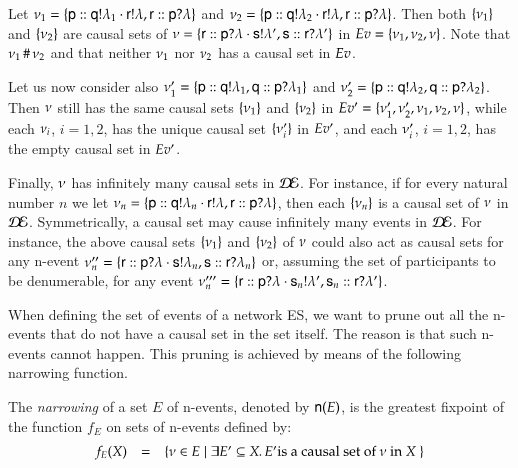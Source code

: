 \begin{example}
  Let $\nu_1=\{{\sf p}:: {\sf q}!\lambda_1\cdot
      {\sf r}!\lambda,{\sf r}:: {\sf p}?\lambda\}$ and
  $\nu_2=\{{\sf p}:: {\sf q}!\lambda_2\cdot
      {\sf r}!\lambda,{\sf r}:: {\sf p}?\lambda\}$.  Then both $\{\nu_1\}$ and
  $\{\nu_2\}$ are causal sets of $\nu=\{{\sf r}:: {\sf p}?\lambda
      \cdot{\sf s}!  \lambda',{\sf s}:: {\sf r}?\lambda'\}$ in $Ev =
  \{\nu_1, \nu_2, \nu\}$. Note that $\nu_1 \,\#\,
  \nu_2$ and that neither $\nu_1$ nor $\nu_2$ has a causal
  set in $Ev$.

Let us now consider also 
$\nu'_1=\{{\sf p}:: {\sf q}!\lambda_1,{\sf q}:: {\sf p}?\lambda_1\}$ and
$\nu'_2=\{{\sf p}:: {\sf q}!\lambda_2,{\sf q}:: {\sf p}?\lambda_2\}$.  Then
$\nu$ still has the same causal sets $\{\nu_1\}$ and
$\{\nu_2\}$ in $Ev' = \{\nu'_1, \nu'_2, \nu_1,
  \nu_2, \nu\}$, while each $\nu_i$, $i=1,2$, has the unique
causal set $\{\nu'_i\}$ in $Ev'$, and each $\nu'_i$,
$i=1,2$, has the empty causal set in $Ev'$.

Finally, $\nu$ has infinitely many causal sets in $\mathcal{D\!E}$.  For
instance, if for every natural number $n$ we let
$\nu_n=\{{\sf p}:: {\sf q}!\lambda_n\cdot {\sf r}!\lambda,{\sf r}:: {\sf p}?\lambda\}$,
then each $\{\nu_n\}$ is a causal set of $\nu$ in $\mathcal{D\!E}$.
Symmetrically, a causal set may cause infinitely many events in
$\mathcal{D\!E}$. For instance, the above causal sets $\{\nu_1\}$ and
$\{\nu_2\}$ of $\nu$ could also act as causal sets for any
n-event $\nu''_n=\{{\sf r}:: {\sf p}?\lambda \cdot{\sf s}!
    \lambda_n,{\sf s}:: {\sf r}?\lambda_n\}$ or, assuming the set of participants
to be denumerable, for any event $%
\netev'''_n=\set{\locev\pr{\pp?\la \cdot \ps_n!
    \la'},\locev{\ps_n}{\pr?\la'}}$.  
\end{example}


When defining the set of events of a network ES, we want to prune out
all the n-events that do not have
a causal set in the set itself.  The reason is that such
n-events cannot happen.  This pruning is achieved by means of the
following narrowing function.

\begin{definition}
The \emph{narrowing} of a set $E$ of n-events, denoted by ${\sf n}(E)$,
is the greatest fixpoint of the function $f_E$ on sets of 
n-events defined by:
\[
\begin{array}{lll}
f_E(X) &=& \{\nu\in E \mid \exists E' \subseteq X . \, E' \text{is a causal
    set of } \nu \text{ in $X$ }  \}
 \end{array}
\] 
\end{definition}

